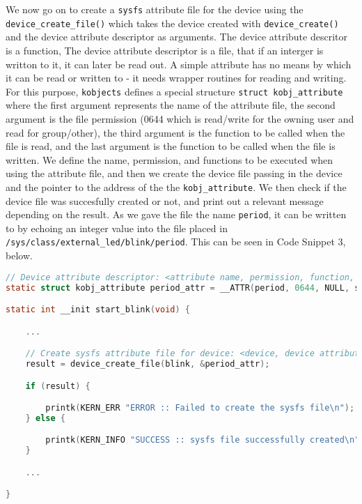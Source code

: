 \documentclass[a4paper,oneside,onecolumn]{article}
\newcommand{\code}[1]{\colorbox{codegray}{\texttt{#1}}}
\begin{document}
We now go on to create a \texttt{sysfs} attribute file for the device using the \code{device\_create\_file()} which takes the device created with \code{device\_create()} and the device attribute descriptor as arguments. The device attribute descritor is a function, The device attribute descriptor is a file, that if an interger is writton to it, it can later be read out. A simple attribute has no means by which it can be read or written to - it needs wrapper routines for reading and writing. For this purpose, \texttt{kobjects} defines a special structure \code{struct kobj\_attribute} where the first argument represents the name of the attribute file, the second argument is the file permission (0644 which is read/write for the owning user and read for group/other), the third argument is the function to be called when the file is read, and the last argument is the function to be called when the file is written.
\newline
\newline
We define the name, permission, and functions to be executed when using the attribute file, and then we create the device file passing in the device and the pointer to the address of the the \code{kobj\_attribute}. We then check if the device file was succesfully created or not, and print out a relevant message depending on the result.
\newline
As we gave the file the name \texttt{period}, it can be written to by echoing an integer value into the file placed in \texttt{/sys/class/external\_led/blink/period}.
\newline
This can be seen in Code Snippet 3, below.

\begin{lstlisting}[language=c, label={lst:sysfs}, caption={Creating a \texttt{sysfs} Attribute File}]
// Device attribute descriptor: <attribute name, permission, function, function>
static struct kobj_attribute period_attr = __ATTR(period, 0644, NULL, store_period);

static int __init start_blink(void) {

    ...

    // Create sysfs attribute file for device: <device, device attribute descriptor>
    result = device_create_file(blink, &period_attr);

    if (result) {

        printk(KERN_ERR "ERROR :: Failed to create the sysfs file\n");
    } else {

        printk(KERN_INFO "SUCCESS :: sysfs file successfully created\n");
    }

    ...

}
\end{lstlisting}
\end{document}
